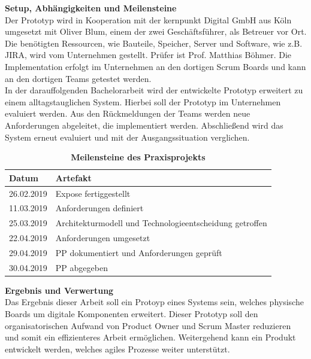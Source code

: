 \documentclass[12pt,titlepage]{scrartcl}
\begin{document}
\textbf{Setup, Abhängigkeiten und Meilensteine} \\
Der Prototyp wird in Kooperation mit der kernpunkt Digital GmbH aus Köln umgesetzt mit Oliver Blum, einem der zwei Geschäftsführer, als Betreuer vor Ort. Die benötigten Ressourcen, wie Bauteile, Speicher, Server und Software, wie z.B. JIRA, wird vom Unternehmen gestellt. Prüfer ist Prof. Matthias Böhmer. Die Implementation erfolgt im Unternehmen an den dortigen Scrum Boards und kann an den dortigen Teams getestet werden. \\
In der darauffolgenden Bachelorarbeit wird der entwickelte Prototyp erweitert zu einem alltagstauglichen System. Hierbei soll der Prototyp im Unternehmen evaluiert werden. Aus den Rückmeldungen der Teams werden neue Anforderungen abgeleitet, die implementiert werden. Abschließend wird das System erneut evaluiert und mit der Ausgangssituation verglichen. \\
\begin{table}[H]
\centering
\caption{\textbf{Meilensteine des Praxisprojekts}}
\begin{tabular}{|c|l|}
\hline
\multicolumn{1}{|l|}{\textbf{Datum}} & {\textbf{Artefakt}} \\ \hline
26.02.2019                                 & Expose fertiggestellt \\ \hline
11.03.2019                                 & Anforderungen definiert\\ \hline
25.03.2019                                       & Architekturmodell und Technologieentscheidung getroffen \\ \hline
22.04.2019                                       & Anforderungen umgesetzt                                  \\ \hline
29.04.2019                                       & PP dokumentiert und Anforderungen geprüft                                \\ \hline
30.04.2019                                       & PP abgegeben\\ \hline
\end{tabular}
\end{table}
\noindent \textbf{Ergebnis und Verwertung} \\
Das Ergebnis dieser Arbeit soll ein Protoyp eines Systems sein, welches physische Boards um digitale Komponenten erweitert. Dieser Prototyp soll den organisatorischen Aufwand von Product Owner und Scrum Master reduzieren und somit ein effizienteres Arbeit ermöglichen. Weitergehend kann ein Produkt entwickelt werden, welches agiles Prozesse weiter unterstützt. 
\end{document}
